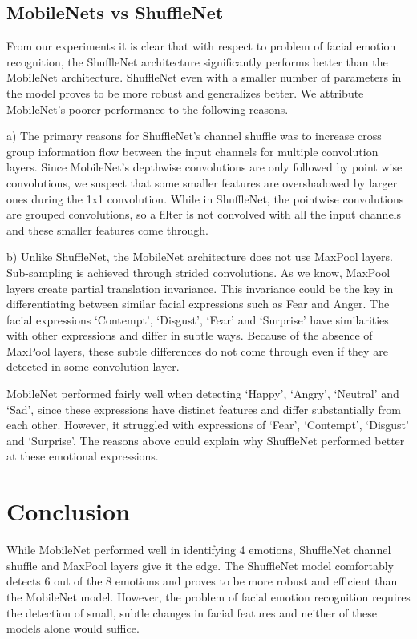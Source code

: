 \documentclass[10pt,twocolumn,letterpaper]{article}
\begin{document}
\subsection{MobileNets vs ShuffleNet}

From our experiments it is clear that with respect to problem of facial emotion recognition, the ShuffleNet architecture significantly performs better than the MobileNet architecture. ShuffleNet even with a smaller number of parameters in the model proves to be more robust and generalizes better. 
We attribute MobileNet’s poorer performance to the following reasons.
 
a) The primary reasons for ShuffleNet’s channel shuffle was to increase cross group information flow between the input channels for multiple convolution layers. Since MobileNet’s depthwise convolutions are only followed by point wise convolutions, we suspect that some  smaller features are overshadowed by larger ones during the 1x1 convolution. While in ShuffleNet, the pointwise convolutions are grouped convolutions, so a filter is not convolved with all the input channels and these smaller features come through.

b) Unlike ShuffleNet, the MobileNet architecture does not use MaxPool layers. Sub-sampling is achieved through strided convolutions. As we know, MaxPool layers create partial translation invariance. This invariance could be the key in differentiating between similar facial expressions such as Fear and Anger. The facial expressions ‘Contempt’, ‘Disgust’, ‘Fear’ and ‘Surprise’ have similarities with other expressions and differ in subtle ways. Because of the absence of MaxPool layers, these subtle differences do not come through even if they are detected in some convolution layer.

MobileNet performed fairly well when detecting ‘Happy’, ‘Angry’, ‘Neutral’ and ‘Sad’, since these expressions have distinct features and differ substantially from each other. However, it struggled with expressions of ‘Fear’, ‘Contempt’, ‘Disgust’ and ‘Surprise’. The reasons above could explain why ShuffleNet performed better at these emotional expressions.

\section{Conclusion}
While MobileNet performed well in identifying 4 emotions, ShuffleNet channel shuffle and MaxPool layers give it the edge. The ShuffleNet model comfortably detects 6 out of the 8 emotions and proves to be more robust and efficient than the MobileNet model.
However, the problem of facial emotion recognition requires the detection of small, subtle changes in facial features and neither of these models alone would suffice.
\end{document}
